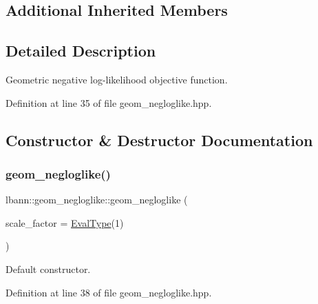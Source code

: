\subsection*{Additional Inherited Members}


\subsection{Detailed Description}
Geometric negative log-\/likelihood objective function. 

Definition at line 35 of file geom\+\_\+negloglike.\+hpp.



\subsection{Constructor \& Destructor Documentation}
\mbox{\label{classlbann_1_1geom__negloglike_a2cd89175b2c6ec556b9697aa75d6068e}} 
\subsubsection{\texorpdfstring{geom\+\_\+negloglike()}{geom\_negloglike()}\hspace{0.1cm}{\footnotesize\ttfamily [1/2]}}
{\footnotesize\ttfamily lbann\+::geom\+\_\+negloglike\+::geom\+\_\+negloglike (\begin{DoxyParamCaption}\item[{\hyperlink{base_8hpp_a3266f5ac18504bbadea983c109566867}{Eval\+Type}}]{scale\+\_\+factor = {\ttfamily \hyperlink{base_8hpp_a3266f5ac18504bbadea983c109566867}{Eval\+Type}(1)} }\end{DoxyParamCaption})\hspace{0.3cm}{\ttfamily [inline]}}

Default constructor. 

Definition at line 38 of file geom\+\_\+negloglike.\+hpp.


